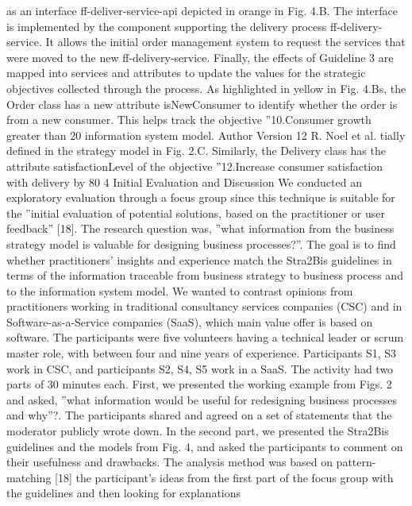 as an interface ff-deliver-service-api depicted in orange in Fig. 4.B. The
interface is implemented by the component supporting the delivery process
ff-delivery-service. It allows the initial order management system to request
the services that were moved to the new ff-delivery-service.
Finally, the effects of Guideline 3 are mapped into services and attributes
to update the values for the strategic objectives collected through the process. As highlighted in yellow in Fig. 4.Bs, the Order class has a new attribute
isNewConsumer to identify whether the order is from a new consumer. This
helps track the objective ”10.Consumer growth greater than 20%
information system model.
Author Version
12 R. Noel et al.
tially defined in the strategy model in Fig. 2.C. Similarly, the Delivery class
has the attribute satisfactionLevel of the objective ”12.Increase consumer
satisfaction with delivery by 80%
4 Initial Evaluation and Discussion
We conducted an exploratory evaluation through a focus group since this technique is suitable for the ”initial evaluation of potential solutions, based on the
practitioner or user feedback” [18]. The research question was, ”what information
from the business strategy model is valuable for designing business processes?”.
The goal is to find whether practitioners’ insights and experience match the
Stra2Bis guidelines in terms of the information traceable from business strategy
to business process and to the information system model. We wanted to contrast
opinions from practitioners working in traditional consultancy services companies (CSC) and in Software-as-a-Service companies (SaaS), which main value
offer is based on software. The participants were five volunteers having a technical leader or scrum master role, with between four and nine years of experience.
Participants S1, S3 work in CSC, and participants S2, S4, S5 work in a SaaS.
The activity had two parts of 30 minutes each. First, we presented the working example from Figs. 2 and asked, ”what information would be useful for
redesigning business processes and why”?. The participants shared and agreed
on a set of statements that the moderator publicly wrote down. In the second
part, we presented the Stra2Bis guidelines and the models from Fig. 4, and
asked the participants to comment on their usefulness and drawbacks. The analysis method was based on pattern-matching [18] the participant’s ideas from the
first part of the focus group with the guidelines and then looking for explanations
